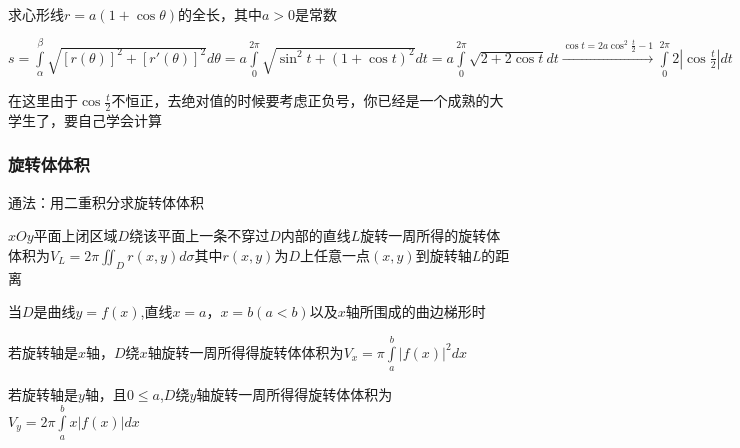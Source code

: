 \documentclass[lang=cn,10pt]{elegantbook}
\begin{document}
\begin{example}
	$\text{求心形线}r=a\left( 1+\cos \theta \right) \text{的全长，其中}a>0\text{是常数}$
\end{example}
\begin{solution}
	
	$s=\int\limits_{\alpha}^{\beta}{\sqrt{\left[ r\left( \theta \right) \right] ^2+\left[ r\prime\left( \theta \right) \right] ^2}d\theta}=a\int\limits_0^{2\pi}{\sqrt{\sin ^2t+\left( 1+\cos t \right) ^2}dt}=a\int\limits_0^{2\pi}{\sqrt{2+2\cos t}dt}\overset{\cos t=2a\cos ^2\frac{t}{2}-1}{\longrightarrow}\int\limits_0^{2\pi}{2|\cos \frac{t}{2}|dt}
	$
	
	在这里由于$\cos\frac{t}{2}$不恒正，去绝对值的时候要考虑正负号，你已经是一个成熟的大学生了，要自己学会计算
\end{solution}
\subsubsection{旋转体体积}
通法：用二重积分求旋转体体积

$xOy$平面上闭区域$D$绕该平面上一条不穿过$D$内部的直线$L$旋转一周所得的旋转体体积为$V_{L}=2\pi \iint_D{r\left( x,y \right) d\sigma}$其中$r\left( x,y \right)$为$D$上任意一点$(x,y)$到旋转轴$L$的距离

当$D$是曲线$y=f(x)$,直线$x=a，x=b(a<b)$以及$x$轴所围成的曲边梯形时

若旋转轴是$x$轴，$D$绕$x$轴旋转一周所得得旋转体体积为$V_x=\pi \int\limits_a^b{|f\left( x \right) |^2dx}$

若旋转轴是$y$轴，且$0\le a$,$D$绕$y$轴旋转一周所得得旋转体体积为$V_y=2\pi \int\limits_a^b{x|f\left( x \right) |dx}$
\end{document}
